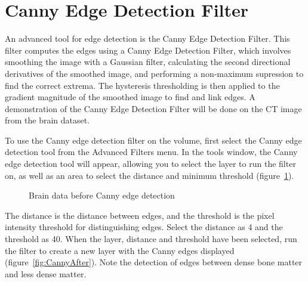 \documentclass[fleqn,11pt,openany]{book}
\begin{document}
\section{Canny Edge Detection Filter}
An advanced tool for edge detection is the Canny Edge Detection Filter. This filter computes the edges using a Canny Edge Detection Filter, which involves smoothing the image with a Gaussian filter, calculating the second directional derivatives of the smoothed image, and performing a non-maximum supression to find the correct extrema. The hysteresis thresholding is then applied to the gradient magnitude of the smoothed image to find and link edges. A demonstration of the Canny Edge Detection Filter will be done on the CT image from the brain dataset.

To use the Canny edge detection filter on the volume, first select the Canny edge detection tool from the Advanced Filters menu. In the tools window, the Canny edge detection tool will appear, allowing you to select the layer to run the filter on, as well as an area to select the distance and minimum threshold (figure~\ref{fig:CannyBefore}). 

\begin{figure}
\caption{Brain data before Canny edge detection}\label{fig:CannyBefore}
\end{figure}

The distance is the distance between edges, and the threshold is the pixel intensity threshold for distinguishing edges. Select the distance as 4 and the threshold as 40. When the layer, distance and threshold have been selected, run the filter to create a new layer with the Canny edges displayed (figure~\ref{fig:CannyAfter}). Note the detection of edges between dense bone matter and less dense matter.
\end{document}
